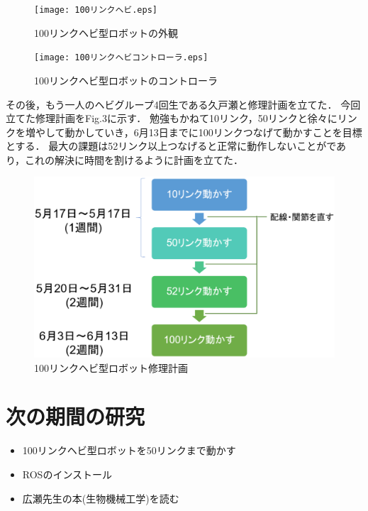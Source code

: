 \documentclass[a4j]{jarticle}
\def\tightlist{\itemsep1pt\parskip0pt\parsep0pt}
\begin{document}
\begin{figure}
\centering
\texttt{[image: 100リンクヘビ.eps]}
\caption{100リンクヘビ型ロボットの外観}
\end{figure}

\begin{figure}
\centering
\texttt{[image: 100リンクヘビコントローラ.eps]}
\caption{100リンクヘビ型ロボットのコントローラ}
\end{figure}

その後，もう一人のヘビグループ4回生である久戸瀬と修理計画を立てた．
今回立てた修理計画をFig.3に示す．
勉強もかねて10リンク，50リンクと徐々にリンクを増やして動かしていき，6月13日までに100リンクつなげて動かすことを目標とする．
最大の課題は52リンク以上つなげると正常に動作しないことがであり，これの解決に時間を割けるように計画を立てた．

\begin{figure}
\centering
\includegraphics{100リンクヘビ修理計画.eps}
\caption{100リンクヘビ型ロボット修理計画}
\end{figure}

\section{次の期間の研究}

\begin{itemize}
\tightlist
\item
  100リンクヘビ型ロボットを50リンクまで動かす
\item
  ROSのインストール
\item
  広瀬先生の本(生物機械工学)を読む
\end{itemize}
\end{document}
